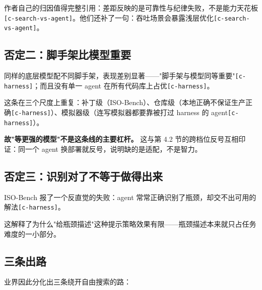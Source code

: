 作者自己的归因值得完整引用：差距反映的是可靠性与纪律失败，不是能力天花板{\scriptsize\texttt{[c-\hspace{0pt}search-\hspace{0pt}vs-\hspace{0pt}agent]}}。他们还补了一句：吞吐场景会暴露浅层优化{\scriptsize\texttt{[c-\hspace{0pt}search-\hspace{0pt}vs-\hspace{0pt}agent]}}。


\subsection{否定二：脚手架比模型重要}

同样的底层模型配不同脚手架，表现差别显著——"脚手架与模型同等重要"{\scriptsize\texttt{[c-\hspace{0pt}harness]}}；而且没有单一 agent 在所有代码库上占优{\scriptsize\texttt{[c-\hspace{0pt}harness]}}。


这条在三个尺度上重复：补丁级（ISO-Bench）、仓库级（本地正确不保证生产正确{\scriptsize\texttt{[c-\hspace{0pt}harness]}}）、模拟器级（连写模拟器都要靠被打过 harness 的 agent{\scriptsize\texttt{[c-\hspace{0pt}harness]}}）。


\textbf{故"等更强的模型"不是这条线的主要杠杆。} 这与第 4.2 节的跨档位反号互相印证：同一个 agent 换部署就反号，说明缺的是适配，不是智力。


\subsection{否定三：识别对了不等于做得出来}

ISO-Bench 报了一个反直觉的失败：agent 常常正确识别了瓶颈，却交不出可用的解法{\scriptsize\texttt{[c-\hspace{0pt}harness]}}。


这解释了为什么"给瓶颈描述"这种提示策略效果有限——瓶颈描述本来就只占任务难度的一小部分。


\subsection{三条出路}

业界因此分化出三条绕开自由搜索的路：


